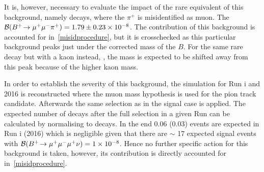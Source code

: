 It is, however, necessary to evaluate the impact of the rare equivalent of this background, namely \bmumupi decays, where the $\pi^{+}$ is misidentified as muon. The $\mathcal{B}({{{B}^+}}\!\rightarrow {\ensuremath{\mu^+\mu^-}}{\ensuremath{{\pi}^+}})=1.79\pm0.23\times 10^{-8}$\cite{Patrignani:2016xqp}. The contribution of this background is accounted for in~\autoref{misidprocedure}, but it is crosschecked as this particular background peaks just under the corrected mass of the $B$. For the same rare decay but with a kaon instead, \bmumuk, the mass is expected to be shifted away from this peak because of the higher kaon mass.

In order to establish the severity of this background, the \bmumupi simulation for Run \Rn{1} and 2016 is reconstructed where the muon mass hypothesis is used for the pion track candidate. %
Afterwards the same selection as in the signal case is applied. The expected number of \bmumupi decays after the full selection in a given Run can be calculated by normalising to \bjpsimumuk decays. In the end 0.06 (0.03) \bmumupi events are expected in Run \Rn{1} (2016) which is negligible given that there are $\sim$ 17 expected signal events with $\mathcal{B}({{{B}^+}}\!\rightarrow {\ensuremath{\mu^+\mu^-\mu^+}}\nu)=1\times 10^{-8}$. Hence no further specific action for this background is taken, however, its contribution is directly accounted for in~\autoref{misidprocedure}.





